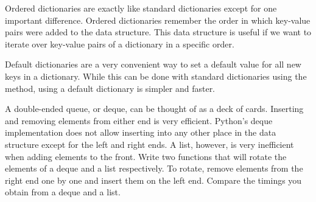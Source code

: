 Ordered dictionaries are exactly like standard dictionaries except for one important
difference.  Ordered dictionaries remember the order in which key-value pairs were added
to the data structure.  This data structure is useful if we want to iterate over key-value pairs
of a dictionary in a specific order.

Default dictionaries are a very convenient way to set a default value for all new keys in a dictionary.  While this can be done with standard dictionaries using the  method,
using a default dictionary is simpler and faster.

\begin{problem}
A double-ended queue, or deque, can be thought of as a deck of cards.
Inserting and removing elements from either end is very efficient.
Python's deque implementation does not allow inserting into any other place
in the data structure except for the left and right ends.
A list, however, is very inefficient when adding elements to the front.
Write two functions that will rotate the elements of a deque and a list respectively.
To rotate, remove elements from the right end one by one and insert them on the left end.
Compare the timings you obtain from a deque and a list.
\end{problem}
